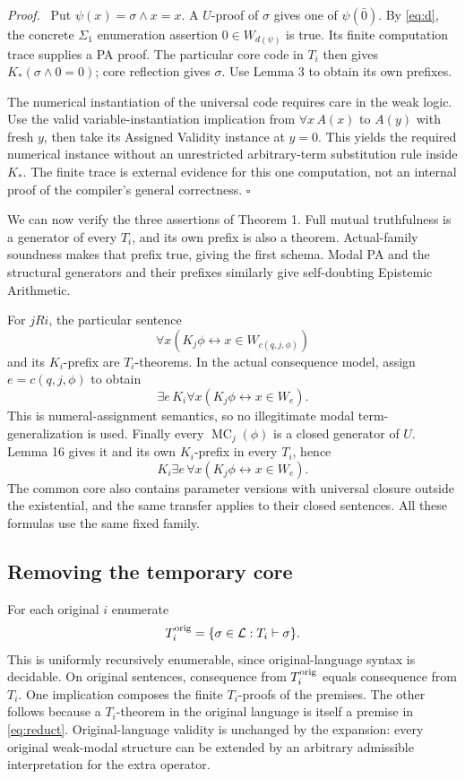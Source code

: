 \documentclass[11pt]{article}
\newcommand{\MC}{\operatorname{MC}}
\newcommand{\qed}{\hfill\ensuremath{\square}}
\newenvironment{proof}{\par\emph{Proof.}\ }{\qed\par}
\begin{document}
\begin{proof}
Put $\psi(x)=\sigma\wedge x=x$. A $U$-proof of $\sigma$ gives one
of $\psi(\bar0)$. By \eqref{eq:d}, the concrete $\Sigma_1$
enumeration assertion $0\in W_{d(\psi)}$ is true. Its finite
computation trace supplies a PA proof. The particular core code
in $T_i$ then gives $K_*(\sigma\wedge0=0)$; core reflection gives
$\sigma$. Use Lemma 3 to obtain its own prefixes.

The numerical instantiation of the universal code requires care
in the weak logic. Use the valid variable-instantiation implication
from $\forall x\,A(x)$ to $A(y)$ with fresh $y$, then take its
Assigned Validity instance at $y=0$. This yields the required
numerical instance without an unrestricted arbitrary-term
substitution rule inside $K_*$. The finite trace is external
evidence for this one computation, not an internal proof of the
compiler's general correctness.
\end{proof}

We can now verify the three assertions of Theorem 1. Full mutual
truthfulness is a generator of every $T_i$, and its own prefix is
also a theorem. Actual-family soundness makes that prefix true,
giving the first schema. Modal PA and the structural generators
and their prefixes similarly give self-doubting Epistemic Arithmetic.

For $jRi$, the particular sentence
\[
 \forall x(K_j\phi\leftrightarrow x\in W_{c(q,j,\phi)})
\]
and its $K_i$-prefix are $T_i$-theorems. In the actual consequence
model, assign $e=c(q,j,\phi)$ to obtain
\[
 \exists e\,K_i\forall x(K_j\phi\leftrightarrow x\in W_e).
\]
This is numeral-assignment semantics, so no illegitimate modal
term-generalization is used. Finally every $\MC_j(\phi)$ is a
closed generator of $U$. Lemma 16 gives it and its own $K_i$-prefix
in every $T_i$, hence
\[
 K_i\exists e\,\forall x(K_j\phi\leftrightarrow x\in W_e).
\]
The common core also contains parameter versions with universal
closure outside the existential, and the same transfer applies to
their closed sentences. All these formulas use the same fixed family.

\subsection*{Removing the temporary core}

For each original $i$ enumerate
\begin{equation}\label{eq:reduct}
 T_i^{\rm orig}=\{\sigma\in\mathcal L:T_i\vdash\sigma\}.
\end{equation}
This is uniformly recursively enumerable, since original-language
syntax is decidable. On original sentences, consequence from
$T_i^{\rm orig}$ equals consequence from $T_i$. One implication
composes the finite $T_i$-proofs of the premises. The other follows
because a $T_i$-theorem in the original language is itself a premise
in \eqref{eq:reduct}. Original-language validity is unchanged by
the expansion: every original weak-modal structure can be extended
by an arbitrary admissible interpretation for the extra operator.
\end{document}
